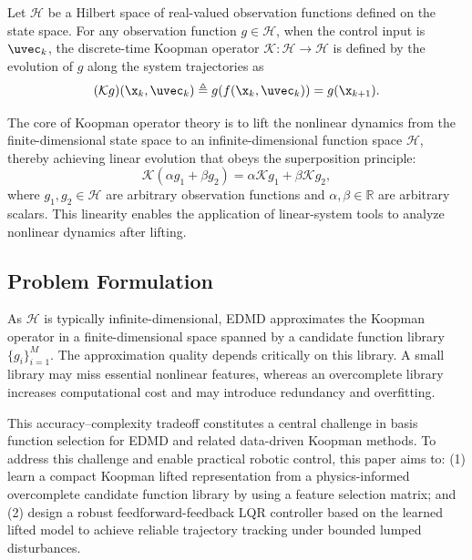 Let \(\mathcal{H}\) be a Hilbert space of real-valued observation functions defined on the state space. For any observation function \(g \in \mathcal{H}\), when the control input is \(\uvec_k\), the discrete-time Koopman operator \(\mathcal{K}: \mathcal{H} \to \mathcal{H}\) is defined by the evolution of \(g\) along the system trajectories as
\begin{equation}
(\mathcal{K}g)(\x_k,\uvec_k) \triangleq g(f(\x_k,\uvec_k)) = g(\x_{k+1}).
\end{equation}

The core of Koopman operator theory is to lift the nonlinear dynamics
from the finite-dimensional state space to an infinite-dimensional
function space $\mathcal{H}$, thereby achieving linear evolution that
obeys the superposition principle:
\begin{equation}
\mathcal{K}(\alpha g_1 + \beta g_2) = \alpha \mathcal{K}g_1 + \beta \mathcal{K}g_2,
\end{equation}
where $g_1, g_2 \in \mathcal{H}$ are arbitrary observation functions and $\alpha, \beta \in \mathbb{R}$ are arbitrary
scalars. This linearity enables the application of linear-system tools to analyze
nonlinear dynamics after lifting.

\subsection{Problem Formulation}
\label{subsec:motivation}
As $\mathcal{H}$ is typically infinite-dimensional, EDMD approximates the Koopman operator in a finite-dimensional space spanned by a candidate function library $\{g_i\}_{i=1}^M$. The approximation quality depends critically on this library. A small library may miss essential nonlinear features, whereas an overcomplete library increases computational cost and may introduce redundancy and overfitting.

This accuracy--complexity tradeoff constitutes a central challenge in basis function selection for EDMD and related data-driven Koopman methods. To address this challenge and enable practical robotic control, this paper aims to: (1) learn a compact Koopman lifted representation from a physics-informed overcomplete candidate function library by using a feature selection matrix; and (2) design a robust feedforward-feedback LQR controller based on the learned lifted model to achieve reliable trajectory tracking under bounded lumped disturbances.


